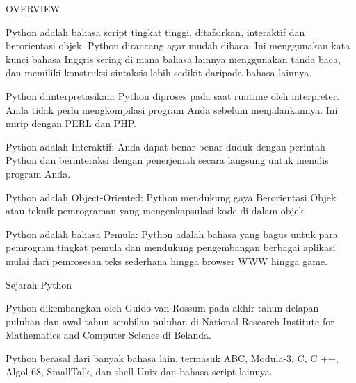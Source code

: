 
\sloppy
{\fontsize{14pt}{14pt}\selectfont OVERVIEW \\} \par
\noindent 
{\fontsize{14pt}{14pt}\selectfont Python adalah bahasa script tingkat tinggi, ditafsirkan, interaktif dan berorientasi objek. Python dirancang agar mudah dibaca. Ini menggunakan kata kunci bahasa Inggris sering di mana bahasa lainnya menggunakan tanda baca, dan memiliki konstruksi sintaksis lebih sedikit daripada bahasa lainnya. \\} \par
\vspace{14pt}
\noindent 
{\fontsize{14pt}{14pt}\selectfont Python diinterpretasikan: Python diproses pada saat runtime oleh interpreter. Anda tidak perlu mengkompilasi program Anda sebelum menjalankannya. Ini mirip dengan PERL dan PHP. \\} \par
\vspace{14pt}
\noindent 
{\fontsize{14pt}{14pt}\selectfont Python adalah Interaktif: Anda dapat benar-benar duduk dengan perintah Python dan berinteraksi dengan penerjemah secara langsung untuk menulis program Anda. \\} \par
\vspace{14pt}
\noindent 
{\fontsize{14pt}{14pt}\selectfont Python adalah Object-Oriented: Python mendukung gaya Berorientasi Objek atau teknik pemrograman yang mengenkapsulasi kode di dalam objek. \\} \par
\vspace{14pt}
\noindent 
{\fontsize{14pt}{14pt}\selectfont Python adalah bahasa Pemula: Python adalah bahasa yang bagus untuk para pemrogram tingkat pemula dan mendukung pengembangan berbagai aplikasi mulai dari pemrosesan teks sederhana hingga browser WWW hingga game. \\} \par
\vspace{14pt}
\noindent 
{\fontsize{14pt}{14pt}\selectfont Sejarah Python \\} \par
\noindent 
{\fontsize{14pt}{14pt}\selectfont Python dikembangkan oleh Guido van Rossum pada akhir tahun delapan puluhan dan awal tahun sembilan puluhan di National Research Institute for Mathematics and Computer Science di Belanda. \\} \par
\vspace{14pt}
\noindent 
{\fontsize{14pt}{14pt}\selectfont Python berasal dari banyak bahasa lain, termasuk ABC, Modula-3, C, C ++, Algol-68, SmallTalk, dan shell Unix dan bahasa script lainnya. \\} \par
